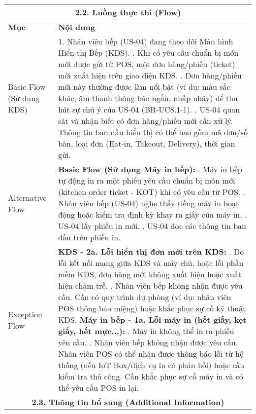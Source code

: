 \begin{longtable}{|m{4cm}|p{11cm}|}
\hline
\multicolumn{2}{|c|}{\textbf{2.2. Luồng thực thi (Flow)}} \\
\hline
\textbf{Mục} & \textbf{Nội dung} \\
\hline
Basic Flow (Sử dụng KDS) & 1. Nhân viên bếp (US-04) đang theo dõi Màn hình Hiển thị Bếp (KDS). \newline 2. Khi có yêu cầu chuẩn bị món mới được gửi từ POS, một đơn hàng/phiếu (ticket) mới xuất hiện trên giao diện KDS. \newline 3. Đơn hàng/phiếu mới này thường được làm nổi bật (ví dụ: màu sắc khác, âm thanh thông báo ngắn, nhấp nháy) để thu hút sự chú ý của US-04 (BR-UC8.1-1). \newline 4. US-04 quan sát và nhận biết có đơn hàng/phiếu mới cần xử lý. Thông tin ban đầu hiển thị có thể bao gồm mã đơn/số bàn, loại đơn (Eat-in, Takeout, Delivery), thời gian gửi. \\
\hline
Alternative Flow & \textbf{Basic Flow (Sử dụng Máy in bếp):} \newline    1. Máy in bếp tự động in ra một phiếu yêu cầu chuẩn bị món mới (kitchen order ticket - KOT) khi có yêu cầu từ POS. \newline    2. Nhân viên bếp (US-04) nghe thấy tiếng máy in hoạt động hoặc kiểm tra định kỳ khay ra giấy của máy in. \newline    3. US-04 lấy phiếu in mới. \newline    4. US-04 đọc các thông tin ban đầu trên phiếu in. \\
\hline
Exception Flow & \textbf{KDS - 2a. Lỗi hiển thị đơn mới trên KDS:} \newline    1. Do lỗi kết nối mạng giữa KDS và máy chủ, hoặc lỗi phần mềm KDS, đơn hàng mới không xuất hiện hoặc xuất hiện chậm trễ. \newline    2. Nhân viên bếp không nhận được yêu cầu. Cần có quy trình dự phòng (ví dụ: nhân viên POS thông báo miệng) hoặc khắc phục sự cố kỹ thuật KDS. \newline \textbf{Máy in bếp - 1a. Lỗi máy in (hết giấy, kẹt giấy, hết mực...):} \newline    1. Máy in không thể in ra phiếu yêu cầu. \newline    2. Nhân viên bếp không nhận được yêu cầu. Nhân viên POS có thể nhận được thông báo lỗi từ hệ thống (nếu IoT Box/dịch vụ in có phản hồi) hoặc cần kiểm tra thủ công. Cần khắc phục sự cố máy in và có thể yêu cầu POS in lại. \\
\hline
\multicolumn{2}{|c|}{\textbf{2.3. Thông tin bổ sung (Additional Information)}} \\

\end{longtable}
